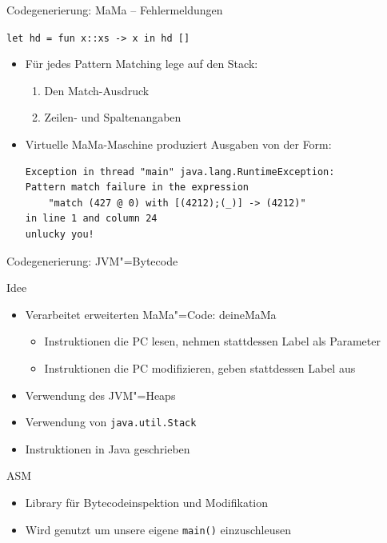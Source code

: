 \documentclass[hyperref={pdfpagelabels=false}]{beamer}
\begin{document}
\begin{frame}[fragile]{Codegenerierung: MaMa -- Fehlermeldungen}
\begin{block}{\texttt{let hd = fun x::xs -> x in hd []}}
\begin{itemize}
\item Für jedes Pattern Matching lege auf den Stack:
\begin{enumerate}
\item Den Match-Ausdruck
\item Zeilen- und Spaltenangaben
\end{enumerate}
\item Virtuelle MaMa-Maschine produziert Ausgaben von der Form:
\begin{small}
\begin{verbatim}
Exception in thread "main" java.lang.RuntimeException: 
Pattern match failure in the expression
	"match (427 @ 0) with [(4212);(_)] -> (4212)"
in line 1 and column 24
unlucky you!
\end{verbatim}
\end{small}
\end{itemize}
\end{block}
\end{frame}

\begin{frame}{Codegenerierung: JVM"=Bytecode}
  \begin{block}{Idee}
    \begin{itemize}
      \item Verarbeitet erweiterten MaMa"=Code: deineMaMa
        \begin{itemize}
          \item Instruktionen die PC lesen, nehmen stattdessen Label als Parameter
          \item Instruktionen die PC modifizieren, geben stattdessen Label aus
        \end{itemize}
      \item Verwendung des JVM"=Heaps
      \item Verwendung von \texttt{java.util.Stack}
      \item Instruktionen in Java geschrieben
    \end{itemize}
  \end{block}
  \begin{block}{ASM}
    \begin{itemize}
      \item Library für Bytecodeinspektion und Modifikation
      \item Wird genutzt um unsere eigene \texttt{main()} einzuschleusen
    \end{itemize}
  \end{block}
\end{frame}
\end{document}
